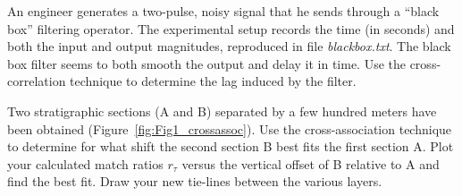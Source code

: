 \begin{problem}
	An engineer generates a two-pulse, noisy signal that he sends through a ``black box'' filtering operator.
The experimental setup records the time (in seconds) and both the input and output magnitudes, reproduced in file
\emph{blackbox.txt}.  The black box filter seems to both smooth the output and delay it in time.
Use the cross-correlation technique to determine the lag induced by the filter.
\end{problem}

\begin{problem}
Two stratigraphic sections (A and B) separated by a few hundred meters have been obtained (Figure~\ref{fig:Fig1_crossassoc}).
Use the cross-association technique to determine for what shift the second section B best fits the first section A.
Plot your calculated match ratios $r_\tau$ versus the vertical offset of B relative to A and find the best fit.
Draw your new tie-lines between the various layers.
\end{problem}
